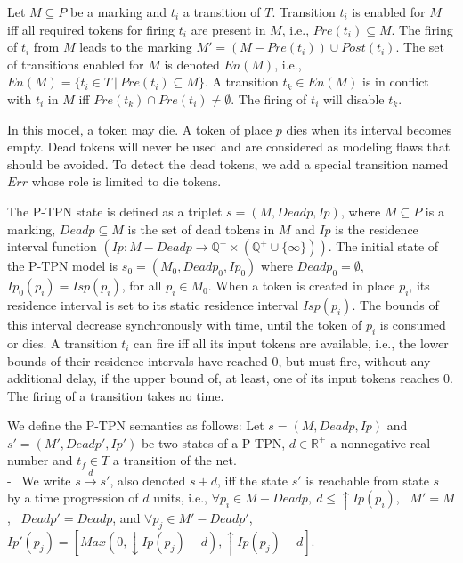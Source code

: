 \documentclass[submission,copyright,creativecommons]{eptcs}
\numberwithin{equation}{section}
\begin{document}
\par Let \(M \subseteq P\) be a marking and \(t_i\) a transition
of $T$. Transition \(t_i\) is enabled for \(M\) iff all required
tokens for firing $t_i$ are present in \(M\), i.e., \( Pre(t_i) \subseteq M\). The firing of $t_i$ from $M$ leads to the marking \( M'= (M - Pre(t_i)) \cup Post(t_i)\). The set of transitions enabled for \(M\) is denoted \(En(M)\),
i.e., \(En(M) =
\{t_i \in T \ | \  Pre(t_i) \subseteq M\}\). A transition  $t_k \in En(M)$ is in conflict with $t_i$ in $M$ iff $Pre(t_k) \cap Pre(t_i) \neq \emptyset$. The firing of $t_i$ will disable $t_k$.
\par In this model, a token may die. A token of place $p$ dies when its interval becomes empty. Dead tokens will never be used and are considered as modeling flaws that should be avoided. To detect the dead tokens, we add a special transition named $Err$ whose role is limited to die tokens.
\par The P-TPN state is defined as a triplet \(s=(M,Deadp, Ip)\), where \(M \subseteq P\) is a
marking, $Deadp \subseteq M$ is the set of dead tokens in $M$ and \(Ip\) is the residence interval function \((Ip: M-Deadp
\rightarrow \mathbb{Q}^{+}\times(\mathbb{Q}^{+}\cup \{\infty\}))\). The initial state of the P-TPN
model is \(s_{0}=(M_{0}, Deadp_0, Ip_{0})\) where $Deadp_0=\emptyset$, \(Ip_{0}(p_i) = Isp(p_i)\),
for all \(p_i \in M_{0}\). When a token is created in place \(p_i\), its residence interval is set to its static residence interval \(Isp(p_i)\). The bounds of this interval decrease synchronously with time, until the token of \(p_i\) is consumed or dies. A transition
\(t_i\) can fire iff all its input tokens are available, i.e., the lower bounds of their residence intervals have reached
\(0\), but must fire, without any additional delay, if the upper
bound of, at least, one of its input tokens reaches \(0\). The firing of a transition takes no time.
\par We define the P-TPN semantics as follows: Let \(s=(M,Deadp,Ip)\) and \(s'=(M',Deadp', Ip')\) be two states of a P-TPN, \( d \in \mathbb{R^+} \) a nonnegative real number and $t_f \in T$ a transition of the net.\\ - \ We write \(s
\overset{d}\rightarrow s'\), also denoted \(s+d\), iff the state
\(s'\)  is reachable from  state \(s\) by a time progression of
\(d\) units, i.e., \(\forall p_i \in M - Deadp, \
d  \leq  {\uparrow Ip(p_i)}\), \ \(M'= M\), \ $Deadp'=Deadp$, and
\(\forall p_j \in M'-Deadp'\), \(Ip'(p_j) = [Max(0, \downarrow Ip(p_j) - d), {\uparrow Ip(p_j)} - d]\).
\end{document}
